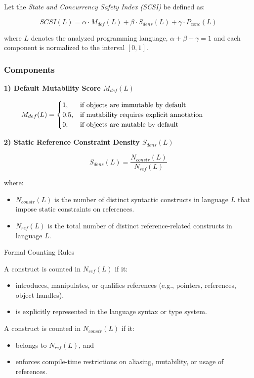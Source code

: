 Let the \textit{State and Concurrency Safety Index (SCSI)} be defined as:

\[
    SCSI(L) = 
    \alpha \cdot M_{def}(L) + 
    \beta \cdot S_{dens}(L) + 
    \gamma \cdot P_{conc}(L)
\]

where $L$ denotes the analyzed programming language, $\alpha + \beta + \gamma = 1$ and each component is normalized to the interval $[0,1]$.

\subsubsection{Components}

\textbf{1) Default Mutability Score $M_{def}(L)$}

\[
M_{def}(L) = 
\begin{cases} 
    1, & \text{\parbox[t]{0.65\linewidth}{\raggedright
            if objects are immutable by default%
         }} \\
    0.5, & \text{\parbox[t]{0.65\linewidth}{\raggedright
            if mutability requires explicit annotation%
         }} \\
    0, & \text{\parbox[t]{0.65\linewidth}{\raggedright
            if objects are mutable by default%
         }}
\end{cases}
\]

\textbf{2) Static Reference Constraint Density $S_{dens}(L)$}

\[
S_{dens}(L) = \frac{N_{constr}(L)}{N_{ref}(L)}
\]

where:
\begin{itemize}
\item $N_{constr}(L)$ is the number of distinct syntactic constructs in language $L$ that impose static constraints on references.
\item $N_{ref}(L)$ is the total number of distinct reference-related constructs in language $L$.
\end{itemize}

Formal Counting Rules

\noindent
A construct is counted in $N_{ref}(L)$ if it:
\begin{itemize}
\item introduces, manipulates, or qualifies references (e.g., pointers, references, object handles),
\item is explicitly represented in the language syntax or type system.
\end{itemize}

\noindent
A construct is counted in $N_{constr}(L)$ if it:
\begin{itemize}
\item belongs to $N_{ref}(L)$, and
\item enforces compile-time restrictions on aliasing, mutability, or usage of references.
\end{itemize}

